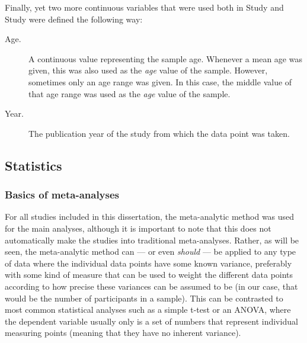 Finally, yet two more continuous variables that were used both in Study  and  Study  were defined the following way:

\begin{description} \item [Age.] A continuous value representing the sample age. Whenever a mean age was given, this was also used as the \emph{age} value of the sample. However, sometimes only an age range was given. In this case, the middle value of that age range was used as the \emph{age} value of the sample. \item [Year.] The publication year of the study from which the data point was taken. \end{description}

\subsection{Statistics} \label{Statistics}

\subsubsection{Basics of meta-analyses} \label{Basic_meta-analyses} For all studies included in this dissertation, the meta-analytic method was used for the main analyses, although it is important to note that this does not automatically make the studies into traditional meta-analyses. Rather, as will be seen, the meta-analytic method can --- or even \emph{should} --- be applied to any type of data where the individual data points have some known variance, preferably with some kind of measure that can be used to weight the different data points according to how precise these variances can be assumed to be (in our case, that would be the number of participants in a sample). This can be contrasted to most common statistical analyses such as a simple t-test or an ANOVA, where the dependent variable usually only is a set of numbers that represent individual measuring points (meaning that they have no inherent variance).

